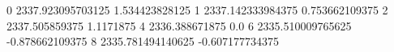 0 2337.923095703125 1.534423828125
1 2337.142333984375 0.753662109375
2 2337.505859375 1.1171875
4 2336.388671875 0.0
6 2335.510009765625 -0.878662109375
8 2335.781494140625 -0.607177734375
